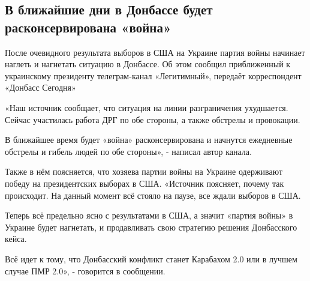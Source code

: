  
 
 

\subsection{В ближайшие дни в Донбассе будет расконсервирована «война»}

После очевидного результата выборов в США на Украине партия войны начинает
наглеть и нагнетать ситуацию в Донбассе. Об этом сообщил приближенный к
украинскому президенту телеграм-канал «Легитимный», передаёт корреспондент
«Донбасс Сегодня»

«Наш источник сообщает, что ситуация на линии разграничения ухудшается.  Сейчас
участилась работа ДРГ по обе стороны, а также обстрелы и провокации. 

В ближайшее время будет «война» расконсервирована и начнутся ежедневные
обстрелы и гибель людей по обе стороны», - написал автор канала.

Также в нём поясняется, что хозяева партии войны на Украине одерживают победу
на президентских выборах в США.  «Источник поясняет, почему так происходит. На
данный момент всё стояло на паузе, все ждали выборов в США. 

Теперь всё предельно ясно с результатами в США, а значит «партия войны» в
Украине будет нагнетать, и продавливать свою стратегию решения Донбасского
кейса.

Всё идет к тому, что Донбасский конфликт станет Карабахом 2.0 или в лучшем
случае ПМР 2.0», - говорится в сообщении.


